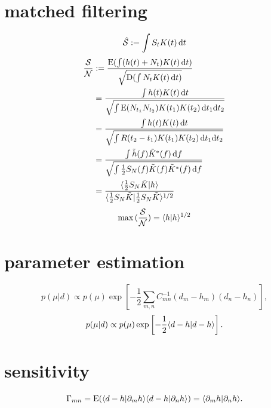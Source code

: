 \section{matched filtering}

\begin{equation}
    \hat{\mathcal{S}}:=\int S_tK(t)\,\mathrm{d} t
\end{equation}
\begin{align}
    \frac{\mathcal{S}}{\mathcal{N}}&:=\frac{\text{E}(\int (h(t)+N_t)K(t)\,\mathrm{d} t)}{\sqrt{\text{D}(\int N_tK(t)\,\mathrm{d} t)}}\\
    &=\frac{\int h(t)K(t)\,\mathrm{d} t}{\sqrt{\int \text{E}(N_{t_1}N_{t_2})K(t_1)K(t_2)\,\mathrm{d} t_1\mathrm{d} t_2}}\\
    &=\frac{\int h(t)K(t)\,\mathrm{d} t}{\sqrt{\int R(t_2-t_1)K(t_1)K(t_2)\,\mathrm{d} t_1\mathrm{d} t_2}}\\
    &=\frac{\int \tilde{h}(f)\tilde{K}^*(f)\,\mathrm{d} f}{\sqrt{\int\frac{1}{2}S_{N}(f)\tilde{K}(f)\tilde{K}^*(f)\,\mathrm{d} f}}\\
    &=\frac{\langle \frac{1}{2}S_{N}\tilde{K}|h \rangle}{\langle \frac{1}{2}S_{N}\tilde{K}|\frac{1}{2}S_{N}\tilde{K} \rangle^{1/2}}
\end{align}
\begin{equation}
    \max{(\frac{\mathcal{S}}{\mathcal{N}})}=\langle h|h \rangle^{1/2}
\end{equation}

\section{parameter estimation}

\begin{equation}
    p(\mu|d)\propto p(\mu)\exp\left[-\frac{1}{2}\sum_{m,n}C_{mn}^{-1}(d_m-h_m)(d_n-h_n)\right],
\end{equation}
\begin{equation}
    p(\mu|d)\propto p(\mu)\exp\left[-\frac{1}{2}\langle d-h|d-h \rangle\right].
\end{equation}

\section{sensitivity}

\begin{equation}
    \Gamma_{mn}=\text{E}(\langle d-h|\partial_m h\rangle\langle d-h|\partial_n h \rangle)=\langle \partial_m h|\partial_n h \rangle.
\end{equation}
